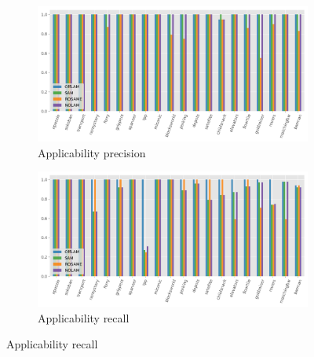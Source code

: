 \begin{figure}[ht]
  \begin{subfigure}[b]{0.45\textwidth}
    \includegraphics[width=\textwidth]{figures/10_traces/barplots/app_precision.png}
    \caption{Applicability precision}
  \end{subfigure}
  \begin{subfigure}[b]{0.45\textwidth}
    \includegraphics[width=\textwidth]{figures/10_traces/barplots/app_recall.png}
    \caption{Applicability recall}
  \end{subfigure}

  \vspace{1em}


\end{figure}
